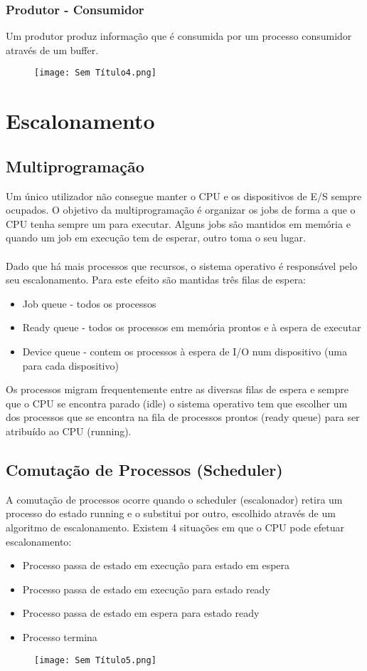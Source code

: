 \documentclass[10pt,a4paper]{report}
\begin{document}
\subsubsection{Produtor - Consumidor}
Um produtor produz informação que é consumida por um processo consumidor através de um buffer.
\begin{figure}[H]
\centering
\texttt{[image: Sem Título4.png]}
\end{figure}
\section{Escalonamento}
\subsection{Multiprogramação}
Um único utilizador não consegue manter o CPU e os dispositivos de E/S sempre ocupados. O objetivo da multiprogramação é organizar os jobs de forma a que o CPU tenha sempre um para executar. Alguns jobs são mantidos em memória e quando um job em execução tem de esperar, outro toma o seu lugar.\\
\\
Dado que há mais processos que recursos, o sistema operativo é responsável pelo seu escalonamento. Para este efeito são mantidas três filas de espera:
\begin{itemize}
\item Job queue - todos os processos
\item Ready queue - todos os processos em memória prontos e à espera de executar
\item Device queue - contem os processos à espera de I/O num dispositivo (uma para cada dispositivo)
\end{itemize}
Os processos migram frequentemente entre as diversas filas de espera e
sempre que o CPU se encontra parado (idle) o sistema operativo tem que
escolher um dos processos que se encontra na fila de processos prontos
(ready queue) para ser atribuído ao CPU (running).
\subsection{Comutação de Processos (Scheduler)}
A comutação de processos ocorre quando  o scheduler (escalonador) retira um processo do estado running e o substitui por outro, escolhido através de um algoritmo de escalonamento. Existem 4 situações em que o CPU pode efetuar escalonamento:
\begin{itemize}
\item Processo passa de estado em execução para estado em espera
\item Processo passa de estado em execução para estado ready
\item Processo passa de estado em espera para estado ready
\item Processo termina
\end{itemize}
\begin{figure}[H]
\centering
\texttt{[image: Sem Título5.png]}
\end{figure}
\end{document}

